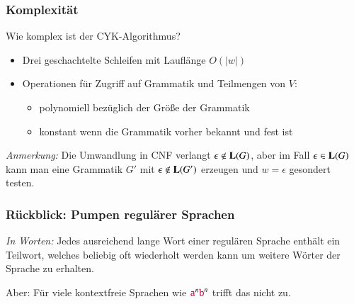 \documentclass[onlymath]{beamer}
\begin{document}
\begin{frame}\frametitle{Komplexität}

\alert{Wie komplex ist der CYK-Algorithmus?}
\begin{itemize}
\item Drei geschachtelte Schleifen mit Lauflänge $O(|w|)$
\item Operationen für Zugriff auf Grammatik und Teilmengen von $V$:%
\begin{itemize}
\item polynomiell bezüglich der Größe der Grammatik
\item konstant wenn die Grammatik vorher bekannt und fest ist
\end{itemize}
\end{itemize}\bigskip

\bigskip

\emph{Anmerkung:} Die Umwandlung in CNF verlangt $\epsilon\notin\textbf{\textcolor{black}{L}}(G)$, aber 
im Fall $\epsilon\in\textbf{\textcolor{black}{L}}(G)$ kann man eine Grammatik $G'$ mit $\epsilon\notin\textbf{\textcolor{black}{L}}(G')$ erzeugen und
$w=\epsilon$ gesondert testen.

\end{frame}


\begin{frame}\frametitle{Rückblick: Pumpen regulärer Sprachen}

\medskip

\emph{In Worten:} Jedes ausreichend lange Wort einer regulären Sprache enthält ein Teilwort, welches beliebig oft wiederholt werden kann um weitere Wörter der Sprache zu erhalten.
\bigskip

\alert{Aber:} Für viele kontextfreie Sprachen wie $\mathtt{\textcolor{purple}{a}}^n\mathtt{\textcolor{purple}{b}}^n$ trifft das nicht zu.

\end{frame}
\end{document}

